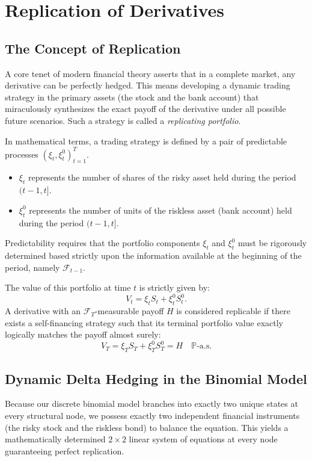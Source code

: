 \chapter{Replication of Derivatives}

\section{The Concept of Replication}

A core tenet of modern financial theory asserts that in a complete market, any derivative can be perfectly hedged. This means developing a dynamic trading strategy in the primary assets (the stock and the bank account) that miraculously synthesizes the exact payoff of the derivative under all possible future scenarios. Such a strategy is called a \textit{replicating portfolio}.

In mathematical terms, a trading strategy is defined by a pair of predictable processes $(\xi_t, \xi_t^0)_{t=1}^T$. 
\begin{itemize}
    \item $\xi_t$ represents the number of shares of the risky asset held during the period $(t-1, t]$.
    \item $\xi_t^0$ represents the number of units of the riskless asset (bank account) held during the period $(t-1, t]$.
\end{itemize}
Predictability requires that the portfolio components $\xi_t$ and $\xi_t^0$ must be rigorously determined based strictly upon the information available at the beginning of the period, namely $\mathcal{F}_{t-1}$. 

The value of this portfolio at time $t$ is strictly given by:
\begin{equation}
    V_t = \xi_t S_t + \xi_t^0 S_t^0.
\end{equation}
A derivative with an $\mathcal{F}_T$-measurable payoff $H$ is considered replicable if there exists a self-financing strategy such that its terminal portfolio value exactly logically matches the payoff almost surely:
\begin{equation}
    V_T = \xi_T S_T + \xi_T^0 S_T^0 = H \quad \mathbb{P}\text{-a.s.}
\end{equation}

\section{Dynamic Delta Hedging in the Binomial Model}

Because our discrete binomial model branches into exactly two unique states at every structural node, we possess exactly two independent financial instruments (the risky stock and the riskless bond) to balance the equation. This yields a mathematically determined $2 \times 2$ linear system of equations at every node guaranteeing perfect replication.

